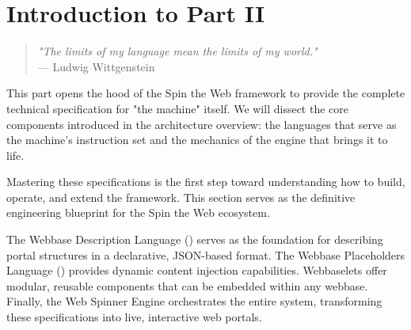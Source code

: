 
\chapter*{Introduction to Part II}
\label{part:framework-mechanics}

\begin{quote}
\textit{"The limits of my language mean the limits of my world."} \\
— Ludwig Wittgenstein
\end{quote}

This part opens the hood of the Spin the Web framework to provide the complete technical specification for "the machine" itself. We will dissect the core components introduced in the architecture overview: the languages that serve as the machine's instruction set and the mechanics of the engine that brings it to life.

Mastering these specifications is the first step toward understanding how to build, operate, and extend the framework. This section serves as the definitive engineering blueprint for the Spin the Web ecosystem.

The Webbase Description Language (\wbdl{}) serves as the foundation for describing portal structures in a declarative, JSON-based format. The Webbase Placeholders Language (\wbpl{}) provides dynamic content injection capabilities. Webbaselets offer modular, reusable components that can be embedded within any webbase. Finally, the Web Spinner Engine orchestrates the entire system, transforming these specifications into live, interactive web portals.

